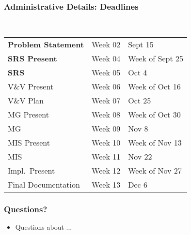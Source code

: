 \documentclass[t,12pt,numbers,fleqn]{beamer}
\begin{document}
\begin{frame}
\frametitle{Administrative Details: Deadlines}
~\newline
\begin{tabular}{l l l}
\textbf{Problem Statement} & Week 02 & Sept 15\\
\textbf{SRS Present} & Week 04 & Week of Sept 25\\
\textbf{SRS} & Week 05 & Oct 4\\
V\&V Present & Week 06 & Week of Oct 16\\
V\&V Plan & Week 07 & Oct 25\\
MG Present & Week 08 & Week of Oct 30\\
MG & Week 09 & Nov 8\\
MIS Present & Week 10 & Week of Nov 13\\
MIS & Week 11 & Nov 22\\
Impl.\ Present & Week 12 & Week of Nov 27\\
Final Documentation & Week 13 & Dec 6\\
\end {tabular}

\end{frame}


\begin{frame}
\frametitle{Questions?}
\begin{itemize}
\item Questions about ...
\end{itemize}
\end{frame}

\end{document}
